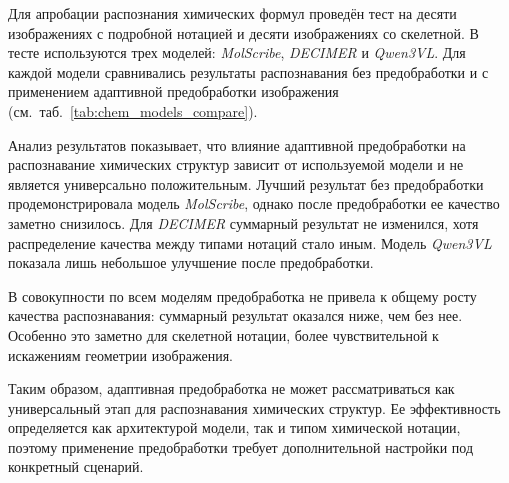 Для апробации распознания химических формул проведён тест на десяти изображениях с подробной нотацией и десяти изображениях со скелетной. В тесте используются трех моделей: \textit{MolScribe}, \textit{DECIMER} и \textit{Qwen3VL}. Для каждой модели сравнивались результаты распознавания без предобработки и с применением адаптивной предобработки изображения (см.~таб.~\ref{tab:chem_models_compare}).

\begin{table}[t]
	\centering
	\small
	\setlength{\tabcolsep}{4pt}
	\renewcommand{\arraystretch}{1.15}
	\resizebox{\textwidth}{!}{
		
	}
	\label{tab:chem_models_compare}
\end{table}

Анализ результатов показывает, что влияние адаптивной предобработки на распознавание химических структур зависит от используемой модели и не является универсально положительным. Лучший результат без предобработки продемонстрировала модель \textit{MolScribe}, однако после предобработки ее качество заметно снизилось. Для \textit{DECIMER} суммарный результат не изменился, хотя распределение качества между типами нотаций стало иным. Модель \textit{Qwen3VL} показала лишь небольшое улучшение после предобработки.

В совокупности по всем моделям предобработка не привела к общему росту качества распознавания: суммарный результат оказался ниже, чем без нее. Особенно это заметно для скелетной нотации, более чувствительной к искажениям геометрии изображения.

Таким образом, адаптивная предобработка не может рассматриваться как универсальный этап для распознавания химических структур. Ее эффективность определяется как архитектурой модели, так и типом химической нотации, поэтому применение предобработки требует дополнительной настройки под конкретный сценарий.